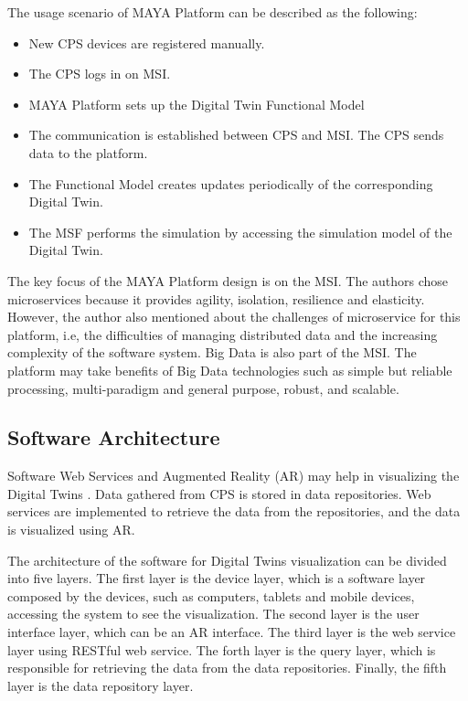 \documentclass[article]{aaltoseries}
\begin{document}
The usage scenario of MAYA Platform can be described as the following:
\begin{itemize}
	\item New CPS devices are registered manually.
	\item The CPS logs in on MSI.
	\item MAYA Platform sets up the Digital Twin Functional Model
	\item The communication is established between CPS and MSI. The CPS sends data to the platform.
	\item The Functional Model creates updates periodically of the corresponding Digital Twin.
	\item The MSF performs the simulation by accessing the simulation model of the Digital Twin.
\end{itemize}

The key focus of the MAYA Platform design is on the MSI. The authors chose microservices because it provides agility, isolation, resilience and elasticity. However, the author also mentioned about the challenges of microservice for this platform, i.e, the difficulties of managing distributed data and the increasing complexity of the software system. Big Data is also part of the MSI. The platform may take benefits of Big Data technologies such as simple but reliable processing, multi-paradigm and general purpose, robust, and scalable.

\subsection{Software Architecture}
Software Web Services and Augmented Reality (AR) may help in visualizing the Digital Twins \cite{schroeder2016visualising}. Data gathered from CPS is stored in data repositories. Web services are implemented to retrieve the data from the repositories, and the data is visualized using AR.

The architecture of the software for Digital Twins visualization can be divided into five layers. The first layer is the device layer, which is a software layer composed by the devices, such as computers, tablets and mobile devices, accessing the system to see the visualization. The second layer is the user interface layer, which can be an AR interface. The third layer is the web service layer using RESTful web service. The forth layer is the query layer, which is responsible for retrieving the data from the data repositories. Finally, the fifth layer is the data repository layer.
\end{document}
